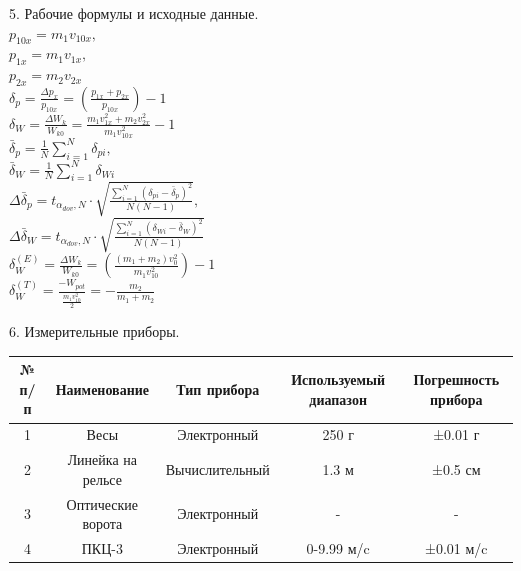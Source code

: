 \documentclass[12pt]{article}
\begin{document}
\begin{flushleft}
    5. Рабочие формулы и исходные данные. \\
    $ p_{10x} = m_1 v_{10x}, $ \\
    $ p_{1x} = m_1 v_{1x}, $ \\
    $ p_{2x} = m_2 v_{2x} $ \\
    $ \delta_p = \frac{\Delta p_x}{p_{10x}} = \left( \frac{p_{1x} + p_{2x}}{p_{10x}} \right) - 1 $ \\
    $ \delta_W = \frac{\Delta W_k}{W_{k0}} = \frac{m_1 v_{1x}^2 + m_2 v_{2x}^2}{m_1 v_{10x}^2} - 1 $ \\ 
    $ \bar{\delta}_p = \frac{1}{N} \sum_{i=1}^N \delta_{pi}, $ \\
    $ \bar{\delta}_W = \frac{1}{N} \sum_{i=1}^N \delta_{Wi} $ \\
    $ \Delta \bar{\delta}_p = t_{\alpha_{dov},N} \cdot \sqrt{\frac{\sum_{i=1}^N (\delta_{pi} - \bar{\delta}_p)^2}{N(N - 1)}}, $ \\
    $ \Delta \bar{\delta}_W = t_{\alpha_{dov},N} \cdot \sqrt{\frac{\sum_{i=1}^N (\delta_{Wi} - \bar{\delta}_W)^2}{N(N - 1)}} $ \\
    $ \delta_W^{(E)} = \frac{\Delta W_k}{W_{k0}} = \left( \frac{(m_1 + m_2) v_0^2}{m_1 v_{10}^2} \right) - 1 $ \\
    $ \delta_W^{(T)} = \frac{-W_{pot}}{\frac{m_1 v_{10}^2}{2}} = -\frac{m_2}{m_1 + m_2} $ \\
\end{flushleft}

\begin{flushleft}
    6. Измерительные приборы. \\
    \begin{table}[h]
        \centering
        \renewcommand{\arraystretch}{1.5}
        {\itshape
        \begin{tabular}{|c|c|c|c|c|}
            \hline
            № п/п & Наименование & Тип прибора & Используемый диапазон & Погрешность прибора\\
            \hline
            1 & Весы & Электронный & 250 г & ±0.01 г \\
            \hline
            2 & Линейка на рельсе & Вычислительный & 1.3 м & ±0.5 см \\
            \hline
            3 & Оптические ворота & Электронный & - & - \\
            \hline
            4 & ПКЦ-3 & Электронный & 0-9.99 м/c & ±0.01 м/c \\
            \hline
        \end{tabular}
        }
    \end{table}
\end{flushleft}
\end{document}
